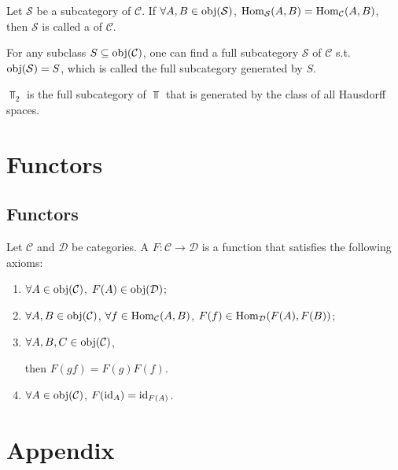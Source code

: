 \documentclass[openany, a5paper]{book}
\begin{document}
\begin{definition}
	Let $\mathcal S$ be a subcategory of $\mathcal C$.
	If $\forall A, B \in \operatorname{obj}(\mathcal S)$, 
	$\operatorname{Hom}_{\mathcal S}(A, B) = \operatorname{Hom}_{\mathcal C}(A, B)$, 
	then $\mathcal S$ is called a  of $\mathcal C$.
\end{definition}

\begin{definition}
	For any subclass $S \subseteq \operatorname{obj}(\mathcal C)$, 
	one can find a full subcategory $\mathcal S$ of $\mathcal C$ s.t.\ $\operatorname{obj}(\mathcal S) = S$, 
	which is called the full subcategory generated by $S$.
\end{definition}

$\Top_2$ is the full subcategory of $\Top$ that is generated by the class of all Hausdorff spaces.

\chapter{Functors}
\section{Functors}

\begin{definition}[Functor]
	Let $\mathcal C$ and $\mathcal D$ be categories.
	A  $F: \mathcal C \to \mathcal D$ is a function that satisfies the following axioms:
	\begin{enumerate}[label=(\roman*)]
		\item $\forall A \in \operatorname{obj}(\mathcal C)$, $F(A) \in \operatorname{obj}(\mathcal D)$;
		\item $\forall A, B \in \operatorname{obj}(\mathcal C)$, 
		$\forall f \in \operatorname{Hom}_{\mathcal C}(A, B)$, 
		 $F(f) \in \operatorname{Hom}_{\mathcal D}(F(A), F(B))$;
		\item $\forall A, B, C \in \operatorname{obj}(\mathcal C)$, 
		\begin{center}
		\end{center}
		then $F(gf) = F(g)  F(f)$.
		\item $\forall A \in \operatorname{obj}(\mathcal C)$, $F(\operatorname{id}_A) = \operatorname{id}_{F(A)}$.
	\end{enumerate}
\end{definition}
\appendix
\chapter{Appendix}

\backmatter
\nocite{*} %
\printbibliography[heading=bibliography, title={Bibliography}]


\printindex
\end{document}

